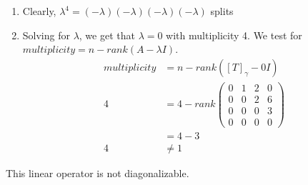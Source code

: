 \documentclass[13pt]{article}
\begin{document}
\begin{enumerate}[label=(\alph*),leftmargin=*]
  \begin{enumerate}
  \item Clearly, $\lambda^4 = (-\lambda)(-\lambda)(-\lambda)(-\lambda)$ splits
  \item Solving for $\lambda$, we get that $\lambda = 0$ with multiplicity 4. We test for $multiplicity = n - rank(A - \lambda I)$.
    \begin{align*}
      multiplicity &= n - rank([T]_\gamma - 0I) \\
      4 &= 4 - rank
          \begin{pmatrix}
            0 & 1 & 2 & 0 \\
            0 & 0 & 2 & 6 \\
            0 & 0 & 0 & 3 \\
            0 & 0 & 0 & 0
          \end{pmatrix} \\
                   &= 4 - 3 \\
      4 &\neq 1
    \end{align*}
  \end{enumerate}
  This linear operator is not diagonalizable.


\end{enumerate}
\end{document}
